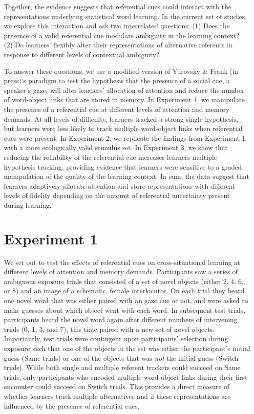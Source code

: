\documentclass[a4paper,man,natbib]{apa6}
\begin{document}
Together, the evidence suggests that referential cues could interact
with the representations underlying statistical word learning. In the
current set of studies, we explore this interaction and ask two
interrelated questions: (1) Does the presence of a valid referential cue
modulate ambiguity in the learning context? (2) Do learners' flexibly
alter their representations of alternative referents in response to
different levels of contextual ambiguity?

To answer these questions, we use a modified version of Yurovsky \&
Frank (in press)`s paradigm to test the hypothesis that the presence of
a social cue, a speaker's gaze, will alter learners' allocation of
attention and reduce the number of word-object links that are stored in
memory. In Experiment 1, we manipulate the presence of a referential cue
at different levels of attention and memory demands. At all levels of
difficulty, learners tracked a strong single hypothesis, but learners
were less likely to track multiple word-object links when referential
cues were present. In Experiment 2, we replicate the findings from
Experiment 1 with a more ecologically valid stimulus set. In Experiment
3, we show that reducing the reliability of the referential cue
increases learners multiple hypothesis tracking, providing evidence that
learners were sensitive to a graded manipulation of the quality of the
learning context. In sum, the data suggest that learners adaptively
allocate attention and store representations with different levels of
fidelity depending on the amount of referential uncertainty present
during learning.

\section{Experiment 1}\label{experiment-1}

We set out to test the effects of referential cues on cross-situational
learning at different levels of attention and memory demands.
Participants saw a series of ambiguous exposure trials that consisted of
a set of novel objects (either 2, 4, 6, or 8) and an image of a
schematic, female interlocutor. On each trial they heard one novel word
that was either paired with an gaze cue or not, and were asked to make
guesses about which object went with each word. In subsequent test
trials, participants heard the novel word again after different numbers
of intervening trials (0, 1, 3, and 7), this time paired with a new set
of novel objects. Importantly, test trials were contingent upon
participants' selection during exposure such that one of the objects in
the set was either the participant's initial guess (Same trials) or one
of the objects that was \emph{not} the initial guess (Switch trials).
While both single and multiple referent trackers could succeed on Same
trials, only participants who encoded multiple word-object links during
their first encounter could succeed on Switch trials. This provides a
direct measure of whether learners track multiple alternatives and if
these representations are influenced by the presence of referential
cues.
\end{document}
